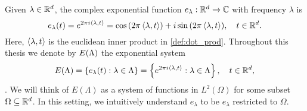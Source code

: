 \documentclass[../thesis.tex]{subfiles}
\begin{document}
Given $\lambda \in \mathbb{R}^d$, the complex exponential function $e_{\lambda}: \mathbb{R}^d \rightarrow \mathbb{C}$ with frequency $\lambda$ is 
\begin{equation*}
    e_{\lambda}(t) = e^{2 \pi i \langle \lambda, t \rangle} = \cos{\left(2 \pi \left \langle \lambda,t \right \rangle\right)} + i \sin{\left(2 \pi \left \langle \lambda,t \right \rangle\right)}, \quad t\in \mathbb{R}^d.
\end{equation*}
Here, $\left \langle \lambda, t \right \rangle$ is the euclidean inner product in \cref{def:dot_prod}. Throughout this thesis we denote by $E(\Lambda)$ the exponential system
\begin{align*}
    E(\Lambda) = \left\{e_\lambda(t) : \lambda \in \Lambda\right\} = \left\{e^{2\pi i \left \langle \lambda,t \right \rangle} : \lambda \in \Lambda\right\}, \quad t\in \mathbb{R}^d,
\end{align*}
. We will think of $E(\Lambda)$ as a system of functions in $L^2(\Omega)$ for some subset $\Omega \subseteq \mathbb{R}^d$. In this setting, we intuitively understand $e_\lambda$ to be $e_\lambda$ restricted to $\Omega$. %
\end{document}
